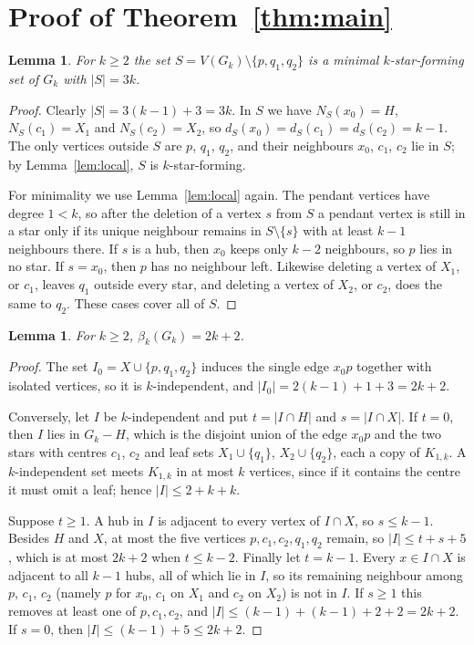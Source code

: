 \documentclass[11pt]{amsart}
\newtheorem{lemma}[theorem]{Lemma}
\theoremstyle{definition}
\theoremstyle{remark}
\begin{document}
\section{Proof of Theorem~\ref{thm:main}}

\begin{lemma}\label{lem:S}
For $k\ge2$ the set $S=V(G_k)\setminus\{p,q_1,q_2\}$ is a minimal $k$-star-forming set of $G_k$ with $|S|=3k$.
\end{lemma}

\begin{proof}
Clearly $|S|=3(k-1)+3=3k$. In $S$ we have $N_S(x_0)=H$, $N_S(c_1)=X_1$ and $N_S(c_2)=X_2$, so $d_S(x_0)=d_S(c_1)=d_S(c_2)=k-1$. The only vertices outside $S$ are $p$, $q_1$, $q_2$, and their neighbours $x_0$, $c_1$, $c_2$ lie in $S$; by Lemma~\ref{lem:local}, $S$ is $k$-star-forming.

For minimality we use Lemma~\ref{lem:local} again. The pendant vertices have degree $1<k$, so after the deletion of a vertex $s$ from $S$ a pendant vertex is still in a star only if its unique neighbour remains in $S\setminus\{s\}$ with at least $k-1$ neighbours there. If $s$ is a hub, then $x_0$ keeps only $k-2$ neighbours, so $p$ lies in no star. If $s=x_0$, then $p$ has no neighbour left. Likewise deleting a vertex of $X_1$, or $c_1$, leaves $q_1$ outside every star, and deleting a vertex of $X_2$, or $c_2$, does the same to $q_2$. These cases cover all of $S$.
\end{proof}

\begin{lemma}\label{lem:beta}
For $k\ge2$, $\beta_k(G_k)=2k+2$.
\end{lemma}

\begin{proof}
The set $I_0=X\cup\{p,q_1,q_2\}$ induces the single edge $x_0p$ together with isolated vertices, so it is $k$-independent, and $|I_0|=2(k-1)+1+3=2k+2$.

Conversely, let $I$ be $k$-independent and put $t=|I\cap H|$ and $s=|I\cap X|$. If $t=0$, then $I$ lies in $G_k-H$, which is the disjoint union of the edge $x_0p$ and the two stars with centres $c_1$, $c_2$ and leaf sets $X_1\cup\{q_1\}$, $X_2\cup\{q_2\}$, each a copy of $K_{1,k}$. A $k$-independent set meets $K_{1,k}$ in at most $k$ vertices, since if it contains the centre it must omit a leaf; hence $|I|\le2+k+k$.

Suppose $t\ge1$. A hub in $I$ is adjacent to every vertex of $I\cap X$, so $s\le k-1$. Besides $H$ and $X$, at most the five vertices $p,c_1,c_2,q_1,q_2$ remain, so $|I|\le t+s+5$, which is at most $2k+2$ when $t\le k-2$. Finally let $t=k-1$. Every $x\in I\cap X$ is adjacent to all $k-1$ hubs, all of which lie in $I$, so its remaining neighbour among $p$, $c_1$, $c_2$ (namely $p$ for $x_0$, $c_1$ on $X_1$ and $c_2$ on $X_2$) is not in $I$. If $s\ge1$ this removes at least one of $p,c_1,c_2$, and $|I|\le(k-1)+(k-1)+2+2=2k+2$. If $s=0$, then $|I|\le(k-1)+5\le2k+2$.
\end{proof}
\end{document}
